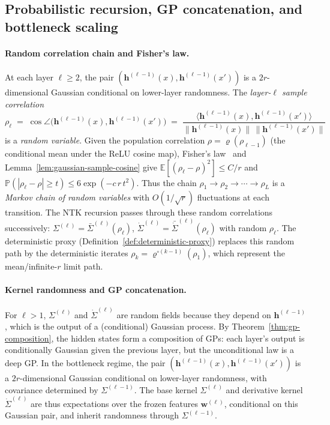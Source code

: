 \subsection{Probabilistic recursion, GP concatenation, and bottleneck scaling}\label{appendix:probabilistic-recursion-details}
\paragraph{Random correlation chain and Fisher's law.}\label{appendix:random-correlation-chain}
At each layer \( \ell \ge 2 \), the pair \( (\bm{h}^{(\ell-1)}(x), \bm{h}^{(\ell-1)}(x')) \) is a \(2r\)-dimensional Gaussian conditional on lower-layer randomness. The \emph{layer-\(\ell\) sample correlation}
\[
\rho_\ell \;=\; \cos\angle\bigl(\bm{h}^{(\ell-1)}(x), \bm{h}^{(\ell-1)}(x')\bigr) \;=\; \frac{\langle \bm{h}^{(\ell-1)}(x), \bm{h}^{(\ell-1)}(x') \rangle}{\|\bm{h}^{(\ell-1)}(x)\|\,\|\bm{h}^{(\ell-1)}(x')\|}
\]
is a \emph{random variable}. Given the population correlation \( \rho = \varrho(\rho_{\ell-1}) \) (the conditional mean under the ReLU cosine map), Fisher's law~\cite{fisher1915probable,hotelling1953new} and Lemma~\ref{lem:gaussian-sample-cosine} give \( \mathbb{E}[(\rho_\ell - \rho)^2] \le C/r \) and \( \mathbb{P}(|\rho_\ell - \rho| \ge t) \le 6\exp(-c\,r\,t^2) \). Thus the chain \( \rho_1 \to \rho_2 \to \cdots \to \rho_L \) is a \emph{Markov chain of random variables} with \( O(1/\sqrt{r}) \) fluctuations at each transition. The NTK recursion passes through these random correlations successively: \( \Sigma^{(\ell)} = \bar{\Sigma}^{(\ell)}(\rho_\ell) \), \( \dot{\Sigma}^{(\ell)} = \bar{\dot{\Sigma}}^{(\ell)}(\rho_\ell) \) with random \( \rho_\ell \). The deterministic proxy (Definition~\ref{def:deterministic-proxy}) replaces this random path by the deterministic iterates \( \rho_k = \varrho^{\circ(k-1)}(\rho_1) \), which represent the mean/infinite-\(r\) limit path.

\paragraph{Kernel randomness and GP concatenation.}
For \( \ell > 1 \), \( \Sigma^{(\ell)} \) and \( \dot{\Sigma}^{(\ell)} \) are random fields because they depend on \( \bm{h}^{(\ell-1)} \), which is the output of a (conditional) Gaussian process. By Theorem~\ref{thm:gp-composition}, the hidden states form a composition of GPs: each layer's output is conditionally Gaussian given the previous layer, but the unconditional law is a deep GP. In the bottleneck regime, the pair \( (\bm{h}^{(\ell-1)}(x), \bm{h}^{(\ell-1)}(x')) \) is a \(2r\)-dimensional Gaussian conditional on lower-layer randomness, with covariance determined by \( \Sigma^{(\ell-1)} \). The base kernel \( \Sigma^{(\ell)} \) and derivative kernel \( \dot{\Sigma}^{(\ell)} \) are thus expectations over the frozen features \( \bm{w}^{(\ell)} \), conditional on this Gaussian pair, and inherit randomness through \( \Sigma^{(\ell-1)} \).

